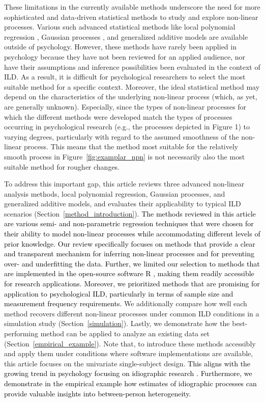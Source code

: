 \documentclass[man, floatsintext]{apa7}
\begin{document}
These limitations in the currently available methods underscore the need for
more sophisticated and data-driven statistical methods to study and explore
non-linear processes. Various such advanced statistical methods like local
polynomial regression \parencite{fan_local_2018}, Gaussian processes
\parencite{rasmussen_gaussian_2006}, and generalized additive models
\parencite{wood_generalized_2006} are available outside of psychology. However,
these methods have rarely been applied in psychology because they have not been
reviewed for an applied audience, nor have their assumptions and inference
possibilities been evaluated in the context of ILD\@. As a result, it is
difficult for psychological researchers to select the most suitable method for
a specific context. Moreover, the ideal statistical method may depend on the
characteristics of the underlying non-linear process (which, as yet,  are
generally unknown). Especially, since the types of non-linear processes for
which the different methods were developed match the types of processes
occurring in psychological research (e.g., the processes depicted in Figure 1)
to varying degrees, particularly with regard to the assumed smoothness of the
non-linear process. This means that the method most suitable for the relatively
smooth process in Figure~\ref{fig:examplar_npn} is not necessarily
also the most suitable method for rougher changes.

To address this important gap, this article reviews three advanced non-linear
analysis methods, local polynomial regression, Gaussian processes, and
generalized additive models, and evaluates their applicability to typical ILD
scenarios (Section~\ref{method_introduction}). \textcolor{black}{ The methods
  reviewed in this article are various semi- and non-parametric regression
  techniques that were chosen for their ability to model non-linear processes
  while accommodating different levels of prior knowledge. Our review
  specifically focuses on methods that provide a clear and transparent
  mechanism
  for inferring non-linear processes and for preventing over- and underfitting
  the
  data. Further, we limited our selection to methods that are implemented
  in
  the open-source software R \parencite{R-base}, making them readily accessible
  for research applications. Moreover, we prioritized methods that are
  promising
  for application to psychological ILD, particularly in terms of sample size
  and
  measurement frequency requirements.} We additionally compare how well each
method recovers different non-linear processes under common ILD conditions in a
simulation study (Section~\ref{simulation}). Lastly, we demonstrate how the
best-performing method can be applied to analyze an existing data set
(Section~\ref{empirical_example}). Note that, to introduce these methods
accessibly and apply them under conditions where software implementations are
available, this article focuses on the univariate single-subject design.
\textcolor{black}{ This aligns with the growing trend in psychology focusing on
  idiographic research
  \parencite[e.g.,][]{klaassen_all_2018,
    molenaar_manifesto_2004,hamaker_why_2012}.
  Furthermore, we demonstrate in the empirical example how estimates of
  idiographic processes can provide valuable insights into between-person
  heterogeneity.}
\end{document}
